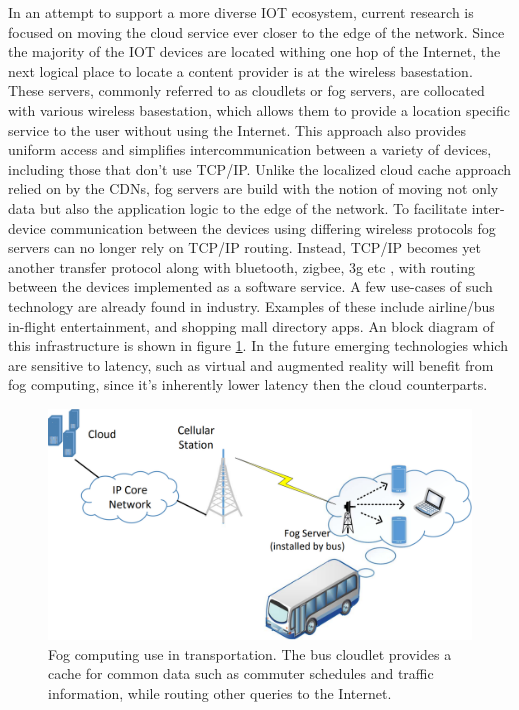 In an attempt to support a more diverse IOT ecosystem, current research is focused on moving the cloud service ever closer to the edge of the network. Since the majority of the IOT devices are located withing one hop of the Internet, the next logical place to locate a content provider is at the wireless basestation.\cite{satyanarayanan2017emergence} These servers, commonly referred to as cloudlets or fog servers, are collocated with various wireless basestation, which allows them to provide a location specific service to the user without using the Internet. This approach also provides uniform access and simplifies intercommunication between a variety of devices, including those that don't use TCP/IP. Unlike the localized cloud cache approach relied on by the CDNs, fog servers are build with the notion of moving not only data but also the application logic to the edge of the network. To facilitate inter-device communication between the devices using differing wireless protocols fog servers can no longer rely on TCP/IP routing. Instead, TCP/IP becomes yet another transfer protocol along with bluetooth, zigbee, 3g etc , with routing between the devices implemented as a software service.\cite{edgeiot} A few use-cases of such technology are already found in industry. Examples of these include airline/bus in-flight entertainment, and shopping mall directory apps. An block diagram of this infrastructure is shown in figure \ref{lit:fig:3}. In the future emerging technologies which are sensitive to latency, such as virtual and augmented reality will benefit from fog computing, since it's inherently lower latency then the cloud counterparts.

\begin{figure}[h]
	\centering
	\includegraphics[width=0.6\linewidth]{img/fog_comp.png}	
	\caption{Fog computing use in transportation. The bus cloudlet provides a cache for common data such as commuter schedules and traffic information, while routing other queries to the Internet.\cite{edgeiot}}
	\label{lit:fig:3}
\end{figure}


